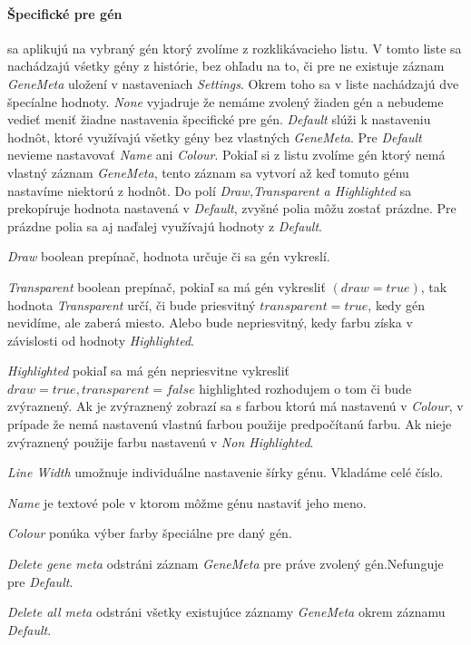 \paragraph{Špecifické pre gén} sa aplikujú na vybraný gén ktorý zvolíme z rozklikávacieho listu.
V tomto liste sa nachádzajú vśetky gény z histórie, bez ohľadu na to, či pre ne existuje záznam \emph{GeneMeta} uložení v nastaveniach \emph{Settings}.
Okrem toho sa v liste nachádzajú dve špecíalne hodnoty. \emph{None} vyjadruje že nemáme zvolený žiaden gén a nebudeme vedieť meniť žiadne nastavenia špecifické pre gén.
\emph{Default} slúži k nastaveniu hodnôt, ktoré využívajú všetky gény bez vlastných \emph{GeneMeta}. Pre \emph{Default} nevieme nastavovať \emph{Name} ani \emph{Colour}.
Pokiaľ si z listu zvolíme gén ktorý nemá vlastný záznam \emph{GeneMeta}, tento záznam sa vytvorí až keď tomuto génu nastavíme niektorú z hodnôt.
Do polí \emph{Draw,Transparent a Highlighted} sa prekopíruje hodnota nastavená v \emph{Default}, zvyšné polia môžu zostať prázdne. Pre prázdne polia sa aj naďalej využívajú hodnoty z \emph{Default}.

\emph{Draw} boolean prepínač, hodnota určuje či sa gén vykreslí.

\emph{Transparent} boolean prepínač, pokiaľ sa má gén vykresliť $(draw=true)$, tak hodnota \emph{Transparent} určí, či bude priesvitný $transparent=true$, kedy gén nevidíme, ale zaberá miesto.
Alebo bude nepriesvitný, kedy farbu získa v závislosti od hodnoty \emph{Highlighted}.

\emph{Highlighted} pokiaľ sa má gén nepriesvitne vykresliť $draw=true,transparent=false$ highlighted rozhodujem o tom či bude zvýraznený.
Ak je zvýraznený zobrazí sa s farbou ktorú má nastavenú v \emph{Colour}, v prípade že nemá nastavenú vlastnú farbou použije predpočítanú farbu. Ak nieje zvýraznený použije farbu nastavenú v \emph{Non Highlighted}. 

\emph{Line Width} umožnuje individuálne nastavenie šírky génu. Vkladáme celé číslo.

\emph{Name} je textové pole v ktorom môžme génu nastaviť jeho meno.

\emph{Colour} ponúka výber farby špeciálne pre daný gén.

\emph{Delete gene meta} odstráni záznam \emph{GeneMeta} pre práve zvolený gén.Nefunguje pre \emph{Default}.

\emph{Delete all meta} odstráni všetky existujúce záznamy \emph{GeneMeta} okrem záznamu \emph{Default}.

